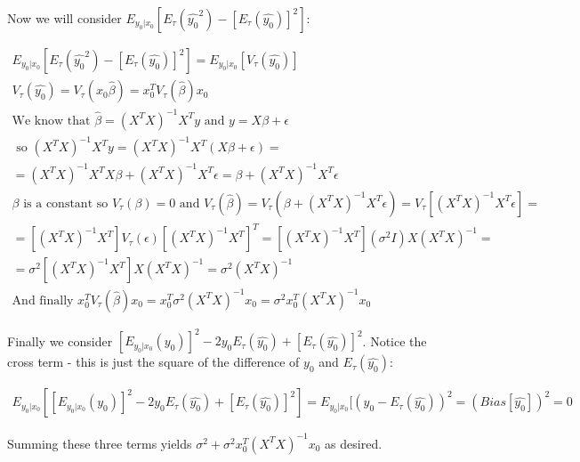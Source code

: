 \noindent
Now we will consider 
$E_{y_{0} | x_{0}}[E_{\tau}(\hat{y_{0}}^{2}) - [E_{\tau}(\hat{y_{0}})]^{2}]$:

\begin{gather*}
E_{y_{0} | x_{0}}[E_{\tau}(\hat{y_{0}}^{2}) - [E_{\tau}(\hat{y_{0}})]^{2}] = 
E_{y_{0} | x_{0}}[V_{\tau}(\hat{y_{0}})] \\ 
V_{\tau}(\hat{y_{0}}) = 
V_{\tau}(x_{0} \hat{\beta}) = 
x_{0}^{T} V_{\tau}(\hat{\beta}) x_{0} \\
\text{We know that } 
\hat{\beta} = 
(X^{T} X)^{-1} X^{T} y 
\text{ and } 
y = X \beta + \epsilon \\ 
\text{ so } 
(X^{T} X)^{-1} X^{T} y = 
(X^{T} X)^{-1} X^{T} (X \beta + \epsilon ) = \\
=
(X^{T} X)^{-1} X^{T} X \beta + (X^{T} X)^{-1} X^{T} \epsilon = 
\beta + (X^{T} X)^{-1} X^{T} \epsilon \\
\beta \text{ is a constant so } V_{\tau}(\beta) = 0 \text{ and }
V_{\tau}(\hat{\beta}) = 
V_{\tau}(\beta + (X^{T} X)^{-1} X^{T} \epsilon) = 
V_{\tau}[(X^{T} X)^{-1} X^{T} \epsilon] = \\
=
[(X^{T} X)^{-1} X^{T}] V_{\tau}(\epsilon) [(X^{T} X)^{-1} X^{T}]^{T}= 
[(X^{T} X)^{-1} X^{T}] (\sigma^{2} I) X (X^{T} X)^{-1}  = \\
=
\sigma^{2} [(X^{T} X)^{-1} X^{T}] X (X^{T} X)^{-1} = 
\sigma^{2} (X^{T} X)^{-1} \\
\text{And finally }
x_{0}^{T} V_{\tau}(\hat{\beta}) x_{0} = 
x_{0}^{T} \sigma^{2} (X^{T} X)^{-1} x_{0} = 
\sigma^{2} x_{0}^{T} (X^{T} X)^{-1} x_{0}
\end{gather*}

\noindent
Finally we consider 
$[E_{y_{0} | x_{0}}(y_{0})]^{2} - 2 y_{0} E_{\tau}(\hat{y_{0}}) + 
[E_{\tau}(\hat{y_{0}})]^{2}$. Notice the cross term - this is just the square 
of the difference of $y_{0}$ and $E_{\tau}(\hat{y_{0}})$:

\begin{gather*}
E_{y_{0} | x_{0}}[[E_{y_{0} | x_{0}}(y_{0})]^{2} - 2 y_{0} E_{\tau}(\hat{y_{0}}) + 
[E_{\tau}(\hat{y_{0}})]^{2}] = 
E_{y_{0} | x_{0}}[(y_{0} - E_{\tau}(\hat{y_{0}}))^{2} = 
(Bias[\hat{y_{0}}])^{2} = 0 
\end{gather*}

\noindent
Summing these three terms yields 
$\sigma^{2} + \sigma^{2} x_{0}^{T} (X^{T} X)^{-1} x_{0}$ as desired.